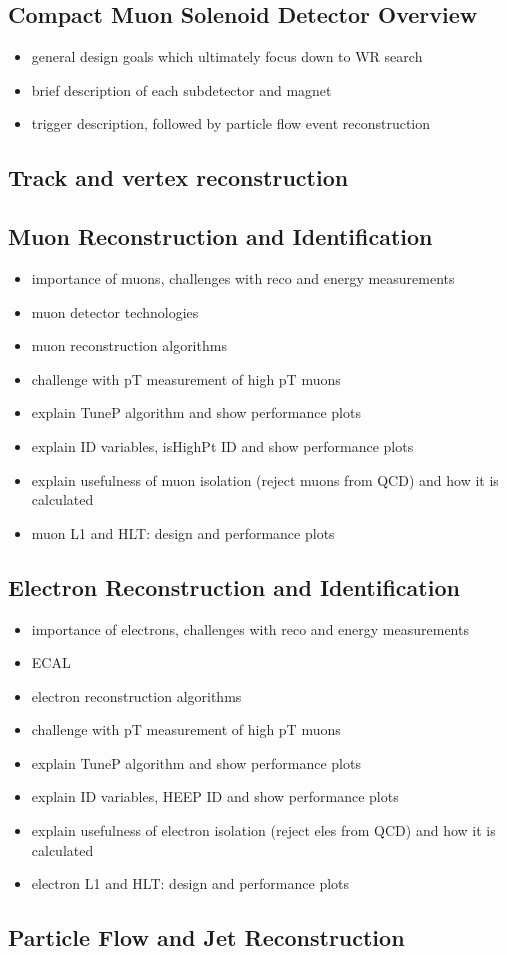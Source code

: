 \subsection{Compact Muon Solenoid Detector Overview}
\begin{itemize}
	\item general design goals which ultimately focus down to WR search
	\item brief description of each subdetector and magnet
	\item trigger description, followed by particle flow event reconstruction
\end{itemize}

\subsection{Track and vertex reconstruction}

\subsection{Muon Reconstruction and Identification}
\begin{itemize}
	\item importance of muons, challenges with reco and energy measurements
	\item muon detector technologies
	\item muon reconstruction algorithms
	\item challenge with pT measurement of high pT muons
	\item explain TuneP algorithm and show performance plots
	\item explain ID variables, isHighPt ID and show performance plots
	\item explain usefulness of muon isolation (reject muons from QCD) and how it is calculated
	\item muon L1 and HLT: design and performance plots
\end{itemize}

\subsection{Electron Reconstruction and Identification}
\begin{itemize}
	\item importance of electrons, challenges with reco and energy measurements
	\item ECAL
	\item electron reconstruction algorithms
	\item challenge with pT measurement of high pT muons
	\item explain TuneP algorithm and show performance plots
	\item explain ID variables, HEEP ID and show performance plots
	\item explain usefulness of electron isolation (reject eles from QCD) and how it is calculated
	\item electron L1 and HLT: design and performance plots
\end{itemize}



\subsection{Particle Flow and Jet Reconstruction}



